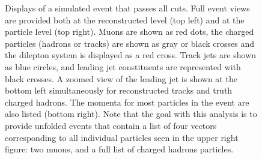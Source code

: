 \begin{figure}[h!]
  \caption{Displays of a simulated event that passes all cuts. Full event views are provided both at the reconstructed level (top left) and at the particle level (top right).
    Muons are shown as red dots, the charged particles (hadrons or tracks) are shown as gray or black crosses and the dilepton system is displayed as a red cross.
    Track jets are shown as blue circles, and leading jet constituents are represented with black crosses.
    A zoomed view of the leading jet is shown at the bottom left simultaneously for reconstructed tracks and truth charged hadrons. The momenta for most particles in the event are also listed (bottom right).
    Note that the goal with this analysis is to provide unfolded events that contain a list of four vectors corresponding to all individual particles seen in the upper right figure: two muons, and a full list of charged hadrons particles.}
  \label{fig:EventDisplay}
\end{figure}

\clearpage
